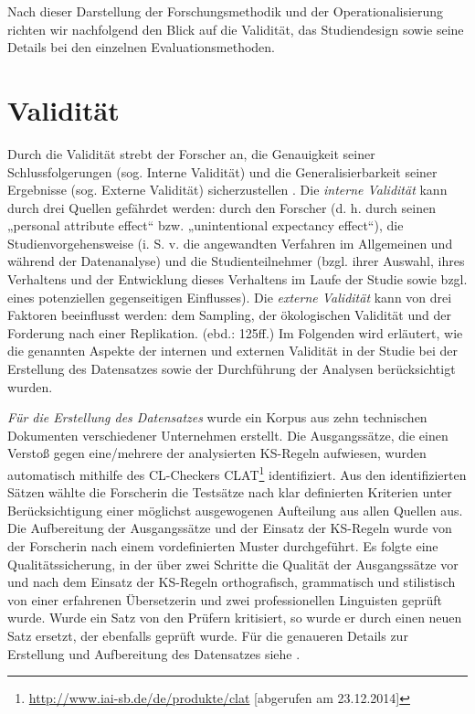 Nach dieser Darstellung der Forschungsmethodik und der Operationalisierung richten wir nachfolgend den Blick auf die Validität, das Studiendesign sowie seine Details bei den einzelnen Evaluationsmethoden.

\section{\label{sec:4.3}Validität}

Durch die Validität strebt der Forscher an, die Genauigkeit seiner Schlussfolgerungen (sog. Interne Validität) und die Generalisierbarkeit seiner Ergebnisse (sog. Externe Validität) sicherzustellen \citep{FreyEtAl1991}. Die \textit{interne Validität} kann durch drei Quellen gefährdet werden: durch den Forscher (d. h. durch seinen „personal attribute effect“ bzw. „unintentional expectancy effect“), die Studienvorgehensweise (i. S. v. die angewandten Verfahren im Allgemeinen und während der Datenanalyse) und die Studienteilnehmer (bzgl. ihrer Auswahl, ihres Verhaltens und der Entwicklung dieses Verhaltens im Laufe der Studie sowie bzgl. eines potenziellen gegenseitigen Einflusses). Die \textit{externe Validität} kann von drei Faktoren beeinflusst werden: dem Sampling, der ökologischen Validität und der Forderung nach einer Replikation. (ebd.: 125ff.) Im Folgenden wird erläutert, wie die genannten Aspekte der internen und externen Validität in der Studie bei der Erstellung des Datensatzes sowie der Durchführung der Analysen berücksichtigt wurden.

\textit{Für die Erstellung des Datensatzes} wurde ein Korpus aus zehn technischen Dokumenten verschiedener Unternehmen erstellt. Die Ausgangssätze, die einen Verstoß gegen eine/mehrere der analysierten KS-Regeln aufwiesen, wurden automatisch mithilfe des CL-Checkers CLAT\footnote{\url{http://www.iai-sb.de/de/produkte/clat}{{{ [abgerufen am 23.12.2014]}}}} \citep{Rösener2010} identifiziert. Aus den identifizierten Sätzen wählte die Forscherin die Testsätze nach klar definierten Kriterien unter Berücksichtigung einer möglichst ausgewogenen Aufteilung aus allen Quellen aus. Die Aufbereitung der Ausgangssätze und der Einsatz der KS-Regeln wurde von der Forscherin nach einem vordefinierten Muster durchgeführt. Es folgte eine Qualitätssicherung, in der über zwei Schritte die Qualität der Ausgangssätze vor und nach dem Einsatz der KS-Regeln orthografisch, grammatisch und stilistisch von einer erfahrenen Übersetzerin und zwei professionellen Linguisten geprüft wurde. Wurde ein Satz von den Prüfern kritisiert, so wurde er durch einen neuen Satz ersetzt, der ebenfalls geprüft wurde. Für die genaueren Details zur Erstellung und Aufbereitung des Datensatzes siehe .

